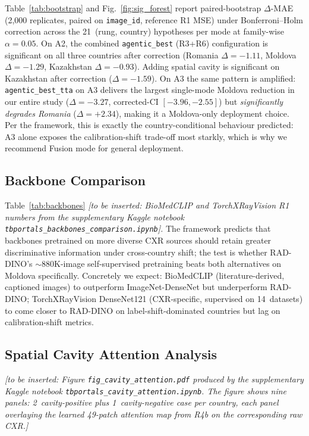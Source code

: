 \documentclass[runningheads]{llncs}
\begin{document}
\noindent
Table~\ref{tab:bootstrap} and Fig.~\ref{fig:sig_forest} report paired-bootstrap $\Delta$-MAE (2{,}000 replicates, paired on \texttt{image\_id}, reference R1 MSE) under Bonferroni--Holm correction across the 21~(rung, country) hypotheses per mode at family-wise $\alpha = 0.05$. On A2, the combined \texttt{agentic\_best} (R3+R6) configuration is significant on all three countries after correction (Romania $\Delta = -1.11$, Moldova $\Delta = -1.29$, Kazakhstan $\Delta = -0.93$). Adding spatial cavity is significant on Kazakhstan after correction ($\Delta = -1.59$). On A3 the same pattern is amplified: \texttt{agentic\_best\_tta} on A3 delivers the largest single-mode Moldova reduction in our entire study ($\Delta = -3.27$, corrected-CI $[-3.96, -2.55]$) but \emph{significantly degrades Romania} ($\Delta = +2.34$), making it a Moldova-only deployment choice. Per the framework, this is exactly the country-conditional behaviour predicted: A3 alone exposes the calibration-shift trade-off most starkly, which is why we recommend Fusion mode for general deployment.

\FloatBarrier

\subsection{Backbone Comparison}
\label{sec:backbone_study}

\noindent
Table~\ref{tab:backbones} \emph{[to be inserted: BioMedCLIP and TorchXRayVision R1 numbers from the supplementary Kaggle notebook \texttt{tbportals\_backbones\_comparison.ipynb}].} The framework predicts that backbones pretrained on more diverse CXR sources should retain greater discriminative information under cross-country shift; the test is whether RAD-DINO's $\sim 880$K-image self-supervised pretraining beats both alternatives on Moldova specifically. Concretely we expect: BioMedCLIP (literature-derived, captioned images) to outperform ImageNet-DenseNet but underperform RAD-DINO; TorchXRayVision DenseNet121 (CXR-specific, supervised on 14~datasets) to come closer to RAD-DINO on label-shift-dominated countries but lag on calibration-shift metrics.

\FloatBarrier

\subsection{Spatial Cavity Attention Analysis}
\label{sec:cavity_attn}

\noindent
\emph{[to be inserted: Figure \texttt{fig\_cavity\_attention.pdf} produced by the supplementary Kaggle notebook \texttt{tbportals\_cavity\_attention.ipynb}. The figure shows nine panels: 2~cavity-positive plus 1~cavity-negative case per country, each panel overlaying the learned 49-patch attention map from R4b on the corresponding raw CXR.]}
\end{document}

